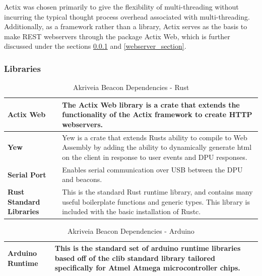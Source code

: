 \bigskip
Actix was chosen primarily to give the flexibility of multi-threading without incurring the typical thought process overhead associated with multi-threading.
Additionally, as a framework rather than a library, Actix serves as the basis to make REST webservers through the package \Gls{Actix Web}, which is further discussed under the sections \ref{software_libraries} and \ref{webserver_section}.

\subsubsection{Libraries}
\label{software_libraries}
\medskip
\begin{table}[H]
\centering
\begin{tabular}{ | m{3.25cm} | m{12.5cm} |}
	\hline
	\textbf{Actix Web} & The Actix Web library is a crate that extends the functionality of the Actix framework to create \Gls{HTTP} webservers. \\
	\hline
	\textbf{Yew} & Yew is a crate that extends Rusts ability to compile to Web Assembly by adding the ability to dynamically generate html on the client in response to user events and DPU responses. \\
	\hline
	\textbf{Serial Port} & Enables serial communication over USB between the DPU and beacons.\\
	\hline
	\textbf{Rust Standard Libraries} & This is the standard Rust runtime library, and contains many useful boilerplate functions and generic types. This library is included with the basic installation of Rustc. \\
	\hline
\end{tabular}
\caption{Akriveia Beacon Dependencies - Rust}
\end{table}

\begin{table}[H]
\centering
\begin{tabular}{ | m{3.25cm} | m{12.5cm} |}
	\hline
	\textbf{Arduino Runtime} & This is the standard set of arduino runtime libraries based off of the clib standard library tailored specifically for Atmel Atmega microcontroller chips. \\
	\hline
\end{tabular}
\caption{Akriveia Beacon Dependencies - Arduino}
\end{table}

\bigskip
